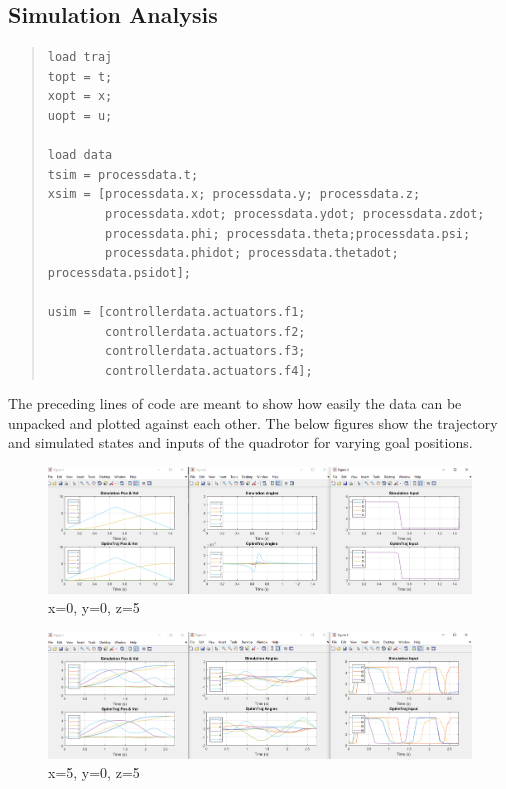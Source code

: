 \documentclass[12pt]{article}
\begin{document}
\subsection{Simulation Analysis}

\begin{quote}
\begin{lstlisting}
load traj
topt = t;
xopt = x;
uopt = u;

load data
tsim = processdata.t;
xsim = [processdata.x; processdata.y; processdata.z;
        processdata.xdot; processdata.ydot; processdata.zdot; 
        processdata.phi; processdata.theta;processdata.psi;
        processdata.phidot; processdata.thetadot; processdata.psidot];
    
usim = [controllerdata.actuators.f1; 
        controllerdata.actuators.f2;
        controllerdata.actuators.f3;
        controllerdata.actuators.f4];
\end{lstlisting}
\end{quote}
The preceding lines of code are meant to show how easily the data can be unpacked and plotted against each other. The below figures show the trajectory and simulated states and inputs of the quadrotor for varying goal positions.
\newline
\newline


\begin{figure}[H]
\centerline{\includegraphics[scale=0.45]{0_0_5.PNG}}
  \caption{\label{0_0_5} x=0, y=0, z=5}
  \label{fig}
\end{figure}

\begin{figure}[H]
\centerline{\includegraphics[scale=0.45]{5_0_5.PNG}}
  \caption{\label{5_0_5} x=5, y=0, z=5}
  \label{fig}
\end{figure}
\end{document}
